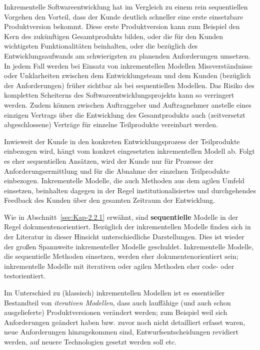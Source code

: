 Inkrementelle Softwareentwicklung hat im Vergleich zu einem rein sequentiellen Vorgehen den Vorteil, dass der Kunde deutlich schneller eine erste einsetzbare Produktversion bekommt. Diese erste Produktversion kann zum Beispiel den Kern des zukünftigen Gesamtprodukts bilden, oder die für den Kunden wichtigsten Funktionalitäten beinhalten, oder die bezüglich des Entwicklungsaufwands am schwierigsten zu planenden Anforderungen umsetzen. In jedem Fall werden bei Einsatz von inkrementellen Modellen Missverständnisse oder Unklarheiten zwischen dem Entwicklungsteam und dem Kunden (\zb bezüglich der Anforderungen) früher sichtbar als bei sequentiellen Modellen. Das Risiko des kompletten Scheiterns des Softwareentwicklungsprojekts kann so verringert werden. Zudem können zwischen Auftraggeber und Auftragnehmer anstelle eines einzigen Vertrags über die Entwicklung des Gesamtprodukts auch (zeitversetzt abgeschlossene) Verträge für einzelne Teilprodukte vereinbart werden.

Inwieweit der Kunde in den konkreten Entwicklungsprozess der Teilprodukte einbezogen wird, hängt vom konkret eingesetzten inkrementellen Modell ab. Folgt es eher sequentiellen Ansätzen, wird der Kunde nur für Prozesse der Anforderungsermittlung und für die Abnahme der einzelnen Teilprodukte einbezogen. Inkrementelle Modelle, die auch Methoden aus dem agilen Umfeld einsetzen, beinhalten dagegen in der Regel institutionalisiertes und durchgehendes Feedback des Kunden über den gesamten Zeitraum der Entwicklung.

Wie in Abschnitt~\ref{sec:Kap-2.2.1} erwähnt, 
sind \textbf{sequentielle} Modelle in der Regel dokumentenorientiert. Bezüglich der inkrementellen Modelle finden sich in der Literatur in dieser Hinsicht unterschiedliche Darstellungen. Dies ist wieder der großen Spannweite inkrementeller Modelle geschuldet. Inkrementelle Modelle, die sequentielle \mbox{Methoden} einsetzen, werden eher dokumentenorientiert sein; inkrementelle Modelle mit iterativen oder agilen Methoden eher code- oder testorientiert.



Im Unterschied zu (klassisch) inkrementellen Modellen ist es essentieller Bestandteil von \textit{iterativen Modellen}, dass auch lauffähige (und auch schon ausgelieferte) Produktversionen verändert werden; zum Beispiel weil sich Anforderungen geändert haben bzw. zuvor noch nicht detailliert erfasst waren, neue Anforderungen hinzugekommen sind, Entwurfsentscheidungen revidiert werden, auf neuere Technologien gesetzt werden soll etc. 

